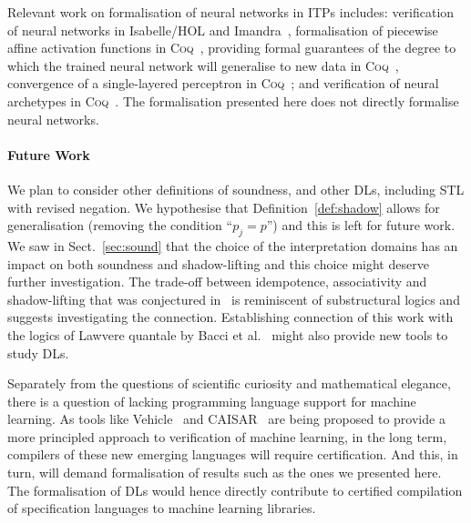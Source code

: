 \documentclass[a4paper,UKenglish,cleveref, autoref, thm-restate]{lipics-v2021}
\def\STL{\textrm{STL}}
\def\coq{\textsc{Coq}}
\begin{document}
Relevant work on formalisation of neural networks in ITPs includes:
verification of neural networks in Isabelle/HOL
\cite{brucker2023verifying} and Imandra~\cite{DesmartinPKD22},
formalisation of piecewise affine activation functions in
\coq~\cite{aleksandrov2023formalizing}, providing formal guarantees of
the degree to which the trained neural network will generalise to new
data in \coq~\cite{bagnall2019certifying}, convergence of a
single-layered perceptron in \coq~\cite{murphy2017verified}; and
verification of neural archetypes in \coq~\cite{de2022use}.  The
formalisation presented here does not directly formalise neural
networks.

\paragraph*{Future Work}
We plan to consider other definitions of soundness, and other DLs,
including \STL{} with revised negation.  We hypothesise that
Definition~\ref{def:shadow} allows for generalisation (removing the
condition ``$p_j = p$'') and this is left for future work.  
%
We saw in Sect.~\ref{sec:sound} that the choice of the interpretation
domains has an impact on both soundness and shadow-lifting and this
choice might deserve further investigation.
%
The trade-off between idempotence, associativity and shadow-lifting
that was conjectured in~\cite{varnai} is reminiscent of substructural
logics and suggests investigating the connection.
%
Establishing connection of this work with the logics of Lawvere
quantale by Bacci et al.\ \cite{abs-2302-01224} 
might also provide new tools to study DLs.

Separately from the questions of scientific curiosity and mathematical elegance,
there is a question of lacking programming language support for machine learning. 
As tools like Vehicle~\cite{daggitt2024vehicle} and CAISAR~\cite{girardsatabin2022caisar}
 are being proposed to provide a more principled 
approach to verification of machine learning, in the long term, compilers of 
these new emerging languages will require certification. And this, in turn, will demand formalisation
of results such as the ones we presented here. The formalisation of DLs would hence directly contribute to 
certified compilation of specification languages to machine learning libraries.   




\end{document}
